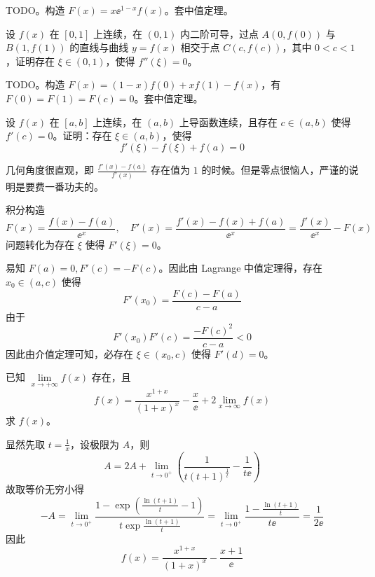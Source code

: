 \begin{solution}
	TODO。构造 $F(x) = x \ee^{1-x} f(x)$。套中值定理。
\end{solution}

\begin{problem}[000013]
设 $f(x)$ 在 $[0, 1]$ 上连续，在 $(0, 1)$ 内二阶可导，过点 $A(0, f(0))$ 与 $B(1, f(1))$ 的直线与曲线 $y=f(x)$ 相交于点 $C(c, f(c))$，其中 $0 < c < 1$，证明存在 $\xi \in (0, 1)$，使得 $f''(\xi) = 0$。
\end{problem}

\begin{solution}
	TODO。构造 $F(x) = (1-x)f(0) + xf(1) - f(x)$，有 $F(0) = F(1) = F(c) = 0$。套中值定理。
\end{solution}

\begin{problem}[000016]
设 $f(x)$ 在 $[a, b]$ 上连续，在 $(a, b)$ 上导函数连续，且存在 $c \in (a, b)$ 使得 $f'(c) = 0$。证明：存在 $\xi \in (a, b)$，使得
\[ f'(\xi) - f(\xi) + f(a) = 0 \]
\end{problem}

\begin{solution}
	几何角度很直观，即 $\frac{f'(x) - f(a)}{f'(x)}$ 存在值为 $1$ 的时候。但是零点很恼人，严谨的说明是要费一番功夫的。

	积分构造
	\[ F(x) = \frac{f(x) - f(a)}{\ee^x}, \quad F'(x) = \frac{f'(x) - f(x) + f(a)}{\ee^x} = \frac{f'(x)}{\ee^x} - F(x) \]
	问题转化为存在 $\xi$ 使得 $F'(\xi) = 0$。

	易知 $F(a) = 0, F'(c) = -F(c)$。因此由 Lagrange 中值定理得，存在 $x_0 \in (a, c)$ 使得
	\[ F'(x_0) = \frac{F(c) - F(a)}{c - a} \]
	由于
	\[ F'(x_0) F'(c) = \frac{-F(c)^2}{c- a} < 0 \]
	因此由介值定理可知，必存在 $\xi \in (x_0, c)$ 使得 $F'(d) = 0$。
\end{solution}

\begin{problem}[000017]
已知 $\lim\limits_{x \to +\infty} f(x)$ 存在，且
\[ f(x) = \frac{x^{1+x}}{(1+x)^x} - \frac{x}{\ee} + 2 \lim_{x \to \infty} f(x) \]
求 $f(x)$。
\end{problem}

\begin{solution}
	显然先取 $t = \frac{1}{x}$，设极限为 $A$，则
	\[ A = 2A + \lim_{t \to 0^+} \left( \frac{1}{t (t+1)^{\frac{1}{t}}} - \frac{1}{t \ee} \right) \]
	故取等价无穷小得
	\[ -A = \lim_{t \to 0^+} \frac{1 - \exp\left( \frac{\ln(t + 1)}{t} - 1\right)}{t \exp\frac{\ln(t + 1)}{t}} = \lim_{t \to 0^+} \frac{1 - \frac{\ln(t + 1)}{t}}{t \ee} = \frac{1}{2 \ee} \]
	因此
	\[ f(x) = \frac{x^{1+x}}{(1+x)^x} - \frac{x + 1}{\ee} \]
\end{solution}


